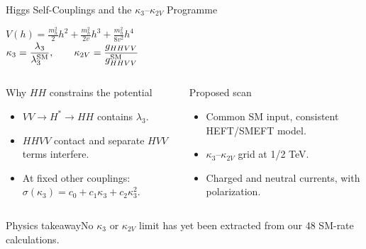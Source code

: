 \documentclass[aspectratio=1610,english]{beamer}
\newcommand{\src}[1]{\vfill{\par\color{black!65}\fontsize{6.4}{7.4}\selectfont\emph{Source:} #1\par}}
\newcommand{\key}[1]{\begin{alertblock}{Physics takeaway}\scriptsize #1\end{alertblock}}
\begin{document}
\begin{frame}[t]{Higgs Self-Couplings and the $\kappa_3$--$\kappa_{2V}$ Programme}
\small

\begin{center}
$\displaystyle V(h)=\frac{m_h^2}{2}h^2+\frac{m_h^2}{2v}h^3+\frac{m_h^2}{8v^2}h^4$\\[.6em]
$\displaystyle \kappa_3=\frac{\lambda_3}{\lambda_3^{\rm SM}},\qquad \kappa_{2V}=\frac{g_{HHVV}}{g_{HHVV}^{\rm SM}}$
\end{center}
\begin{columns}%
\begin{block}{Why $HH$ constrains the potential}
\begin{itemize}\item $VV\to H^*\to HH$ contains $\lambda_3$.
\item $HHVV$ contact and separate $HVV$ terms interfere.
\item At fixed other couplings: $\sigma(\kappa_3)=c_0+c_1\kappa_3+c_2\kappa_3^2$.
\end{itemize}\end{block}
\begin{exampleblock}{Proposed scan}
\begin{itemize}\item Common SM input, consistent HEFT/SMEFT model.
\item $\kappa_3$--$\kappa_{2V}$ grid at 1/2 TeV.
\item Charged and neutral currents, with polarization.
\end{itemize}\end{exampleblock}
\end{columns}
\key{No $\kappa_3$ or $\kappa_{2V}$ limit has yet been extracted from our 48 SM-rate calculations.}

\end{frame}
\end{document}
